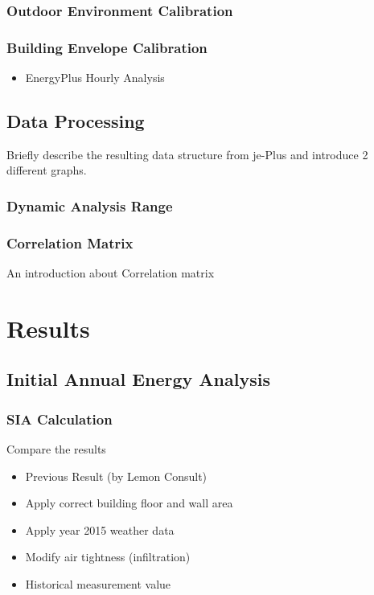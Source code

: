 \documentclass[11pt, a4paper]{article}
\theoremstyle{definition}
\begin{document}
		\subsubsection{Outdoor Environment Calibration}
		\subsubsection{Building Envelope Calibration}
		\begin{itemize}
			\item EnergyPlus Hourly Analysis
		\end{itemize}


	
	\subsection{Data Processing}
		Briefly describe the resulting data structure from je-Plus and introduce 2 different graphs.
		\subsubsection{Dynamic Analysis Range}

		\subsubsection{Correlation Matrix}
		An introduction about Correlation matrix

\section{Results}

	\subsection{Initial Annual Energy Analysis}
		\subsubsection{SIA Calculation}
			Compare the results
			\begin{itemize}
			 	\item Previous Result (by Lemon Consult)
			 	\item Apply correct building floor and wall area
			 	\item Apply year 2015 weather data
			 	\item Modify air tightness (infiltration)
			 	\item Historical measurement value
			 \end{itemize}
			  
\end{document}
